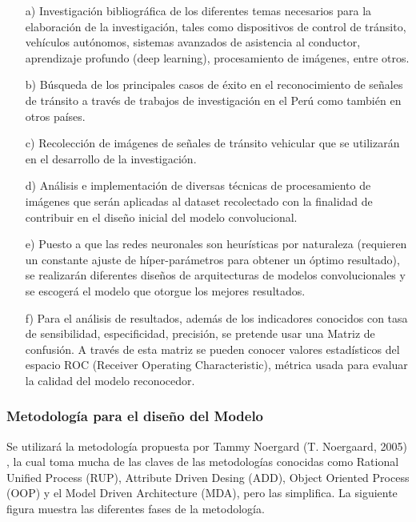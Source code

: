 		\begin{enumerate}

		\item[a)]	Investigación bibliográfica de los diferentes temas necesarios para la elaboración de la investigación, tales como dispositivos de control de tránsito, vehículos autónomos, sistemas avanzados de asistencia al conductor, aprendizaje profundo (deep learning), procesamiento de imágenes, entre otros.
		
		\item[b)]	Búsqueda de los principales casos de éxito en el reconocimiento de señales de tránsito a través de trabajos de investigación en el Perú como también en otros países.

		\item[c)]	Recolección de imágenes de señales de tránsito vehicular que se utilizarán en el desarrollo de la investigación.

		\item[d)]	Análisis e implementación de diversas técnicas de procesamiento de imágenes que serán aplicadas al dataset recolectado con la finalidad de contribuir en el diseño inicial del modelo convolucional.

		\item[e)]	Puesto a que las redes neuronales son heurísticas por naturaleza (requieren un constante ajuste de híper-parámetros para obtener un óptimo resultado), se realizarán diferentes diseños de arquitecturas de modelos convolucionales y se escogerá el modelo que otorgue los mejores resultados.
		
		\item[f)]	Para el análisis de resultados, además de los indicadores conocidos con tasa de sensibilidad, especificidad, precisión, se pretende usar una Matriz de confusión. A través de esta matriz se pueden conocer valores estadísticos del espacio ROC (Receiver Operating Characteristic), métrica usada para evaluar la calidad del modelo reconocedor.
		
		\end{enumerate}

		\subsubsection{Metodología para el diseño del Modelo}

			Se utilizará la metodología propuesta por Tammy Noergard (T. Noergaard, 2005) , la cual toma mucha de las claves de las metodologías conocidas como Rational Unified Process (RUP), Attribute Driven Desing (ADD), Object Oriented Process (OOP) y el Model Driven Architecture (MDA), pero las simplifica. La siguiente figura muestra las diferentes fases de la metodología.
			
